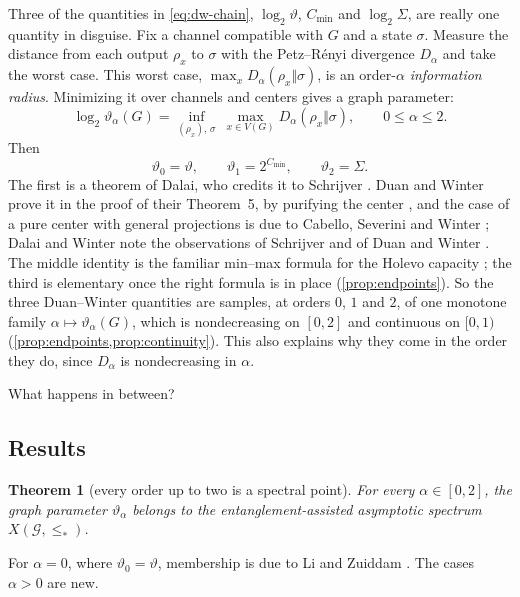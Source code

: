 \documentclass[11pt]{article}
\newtheorem{mainthm}{Theorem}
\theoremstyle{definition}
\newcommand{\vt}{\vartheta}
\newcommand{\cG}{\mathcal G}
\newcommand{\Cmin}{C_{\min}}
\newcommand{\Xs}{X(\cG,\le_*)}
\begin{document}
Three of the quantities in \eqref{eq:dw-chain}, $\log_2\vt$, $\Cmin$ and
$\log_2\Sigma$, are really one quantity in disguise.  Fix a channel compatible with $G$ and a state $\sigma$.  Measure
the distance from each output $\rho_x$ to $\sigma$ with the Petz--R\'enyi
divergence $D_\alpha$ and take the worst case.  This worst case,
$\max_xD_\alpha(\rho_x\Vert\sigma)$, is an order-$\alpha$ \emph{information
radius}.  Minimizing it over channels and centers gives a graph parameter:
\begin{equation}\label{eq:def-intro}
 \log_2\vt_\alpha(G)
 =\inf_{(\rho_x),\,\sigma}\ \max_{x\in V(G)}D_\alpha(\rho_x\Vert\sigma),
 \qquad 0\le\alpha\le2.
\end{equation}
Then
\begin{equation}\label{eq:endpoints-intro}
 \vt_0=\vt,\qquad \vt_1=2^{\Cmin},\qquad \vt_2=\Sigma.
\end{equation}
The first is a theorem of Dalai, who credits it to Schrijver
\cite[Theorem~8]{Dalai2013TIT}.  Duan and Winter prove it in the proof of
their Theorem~5, by purifying the center \cite[Section~V]{DuanWinter2016},
and the case of a pure center with general projections is due to Cabello,
Severini and Winter \cite{CSW2010}; Dalai and Winter note the observations of
Schrijver and of Duan and Winter \cite{DalaiWinter2017}.  The middle identity
is the familiar min--max formula for the Holevo capacity
\cite{OhyaPetzWatanabe1997,SchumacherWestmoreland2001}; the third is
elementary once the right formula is in place
(\cref{prop:endpoints}).  So the three Duan--Winter quantities are samples,
at orders $0$, $1$ and $2$, of one monotone family
$\alpha\mapsto\vt_\alpha(G)$, which is nondecreasing on $[0,2]$ and continuous
on $[0,1)$ (\cref{prop:endpoints,prop:continuity}).  This also explains why
they come in the order they do, since $D_\alpha$ is nondecreasing in $\alpha$.

What happens in between?

\subsection{Results}

\begin{mainthm}[every order up to two is a spectral point]\label{thm:A}
For every $\alpha\in[0,2]$, the graph parameter $\vt_\alpha$ belongs to the
entanglement-assisted asymptotic spectrum $\Xs$.
\end{mainthm}

For $\alpha=0$, where $\vt_0=\vt$, membership is due to Li and Zuiddam
\cite{LiZuiddam2020}.  The cases $\alpha>0$ are new.
\end{document}
